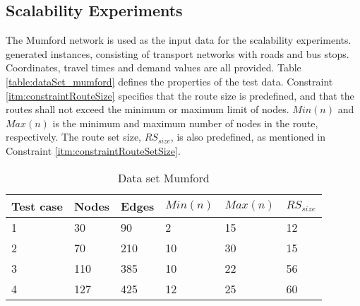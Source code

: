\subsection{Scalability Experiments}
\label{subsec:scalabilityExperiments_setup}

The Mumford network\citep{mumford13} is used as the input data for the scalability experiments. \citet{mumford13} generated instances, consisting of transport networks with roads and bus stops. Coordinates, travel times and demand values are all provided. Table \vref{table:dataSet_mumford} defines the properties of the test data. Constraint \vref{itm:constraintRouteSize} specifies that the route size is predefined, and that the routes shall not exceed the minimum or maximum limit of nodes. $Min(n)$ and $Max(n)$ is the minimum and maximum number of nodes in the route, respectively. The route set size, $RS_{size}$, is also predefined, as mentioned in Constraint \vref{itm:constraintRouteSetSize}.  %

\begin{table}[H]
	\centering
	\begin{tabular}{|l|l|l|l|l|l|}
    	\hline
    	Test case & Nodes&Edges & $Min(n)$ & $Max(n)$ & $RS_{size}$\\
    	\hline
   	    1 & 30&90 & 2&15 & 12 \\
   	    2 & 70&210 & 10&30 & 15 \\
   	    3 & 110&385 & 10&22 & 56 \\
   	    4 & 127&425 & 12&25 & 60 \\
   	    \hline
    \end{tabular}
    \caption{Data set Mumford}
    \label{table:dataSet_mumford}
\end{table}
